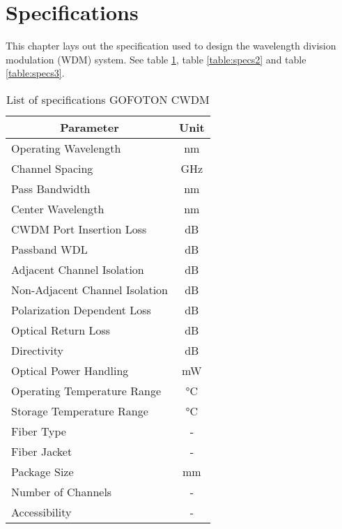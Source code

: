 \section{Specifications}
\label{sec:specifications}
This chapter lays out the specification used to design the wavelength division modulation (WDM) system. See table \ref{table:specs1}, table \ref{table:specs2} and table \ref{table:specs3}.

\begin{table}[!ht]
	\centering
	\cite{noauthor_gofoton_nodate-1}
	\begin{tabular} {|l|c|}
		\hline
		\multicolumn{1}{|c|}{\textbf{Parameter}} & \textbf{Unit} \\ \hline\hline
		Operating Wavelength & \unit{\nm} \\ \hline
		Channel Spacing & \unit{\GHz} \\ \hline
		Pass Bandwidth & \unit{\nm} \\ \hline
		Center Wavelength & \unit{\nm} \\ \hline
		CWDM Port Insertion Loss & \unit{\dB} \\ \hline
		Passband WDL & \unit{\dB} \\ \hline
		Adjacent Channel Isolation & \unit{\dB} \\ \hline
		Non-Adjacent Channel Isolation & \unit{\dB} \\ \hline
		Polarization Dependent Loss & \unit{\dB} \\ \hline
		Optical Return Loss & \unit{\dB} \\ \hline
		Directivity & \unit{\dB} \\ \hline
		Optical Power Handling & \unit{\mW} \\ \hline
		Operating Temperature Range & \unit{\degreeCelsius} \\ \hline
		Storage Temperature Range & \unit{\degreeCelsius} \\ \hline
		Fiber Type & - \\ \hline
		Fiber Jacket & - \\ \hline
		Package Size & \unit{\mm} \\ \hline
		Number of Channels & - \\ \hline
		Accessibility & - \\ \hline
	\end{tabular}
	\caption{List of specifications GOFOTON CWDM}
	\label{table:specs1}
\end{table}

